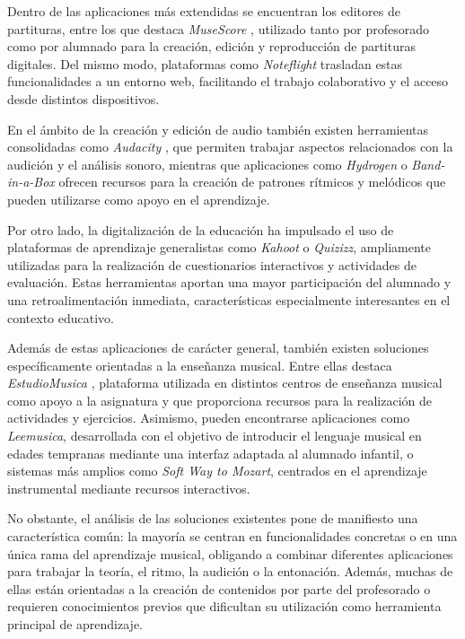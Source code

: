 Dentro de las aplicaciones más extendidas se encuentran los editores de partituras, entre los que destaca \textit{MuseScore} \cite{MuseScoreHandbook}, utilizado tanto por profesorado como por alumnado para la creación, edición y reproducción de partituras digitales. Del mismo modo, plataformas como \textit{Noteflight} \cite{NoteflightGuide} trasladan estas funcionalidades a un entorno web, facilitando el trabajo colaborativo y el acceso desde distintos dispositivos.

En el ámbito de la creación y edición de audio también existen herramientas consolidadas como \textit{Audacity} \cite{AudacityManual}, que permiten trabajar aspectos relacionados con la audición y el análisis sonoro, mientras que aplicaciones como \textit{Hydrogen} o \textit{Band-in-a-Box} ofrecen recursos para la creación de patrones rítmicos y melódicos que pueden utilizarse como apoyo en el aprendizaje.

Por otro lado, la digitalización de la educación ha impulsado el uso de plataformas de aprendizaje generalistas como \textit{Kahoot} \cite{KahootGuide} o \textit{Quizizz}, ampliamente utilizadas para la realización de cuestionarios interactivos y actividades de evaluación. Estas herramientas aportan una mayor participación del alumnado y una retroalimentación inmediata, características especialmente interesantes en el contexto educativo.

Además de estas aplicaciones de carácter general, también existen soluciones específicamente orientadas a la enseñanza musical. Entre ellas destaca \textit{EstudioMusica} \cite{EstudioMusicaWeb}, plataforma utilizada en distintos centros de enseñanza musical como apoyo a la asignatura y que proporciona recursos para la realización de actividades y ejercicios. Asimismo, pueden encontrarse aplicaciones como \textit{Leemusica}, desarrollada con el objetivo de introducir el lenguaje musical en edades tempranas mediante una interfaz adaptada al alumnado infantil, o sistemas más amplios como \textit{Soft Way to Mozart}, centrados en el aprendizaje instrumental mediante recursos interactivos.

No obstante, el análisis de las soluciones existentes pone de manifiesto una característica común: la mayoría se centran en funcionalidades concretas o en una única rama del aprendizaje musical, obligando a combinar diferentes aplicaciones para trabajar la teoría, el ritmo, la audición o la entonación. Además, muchas de ellas están orientadas a la creación de contenidos por parte del profesorado o requieren conocimientos previos que dificultan su utilización como herramienta principal de aprendizaje.

